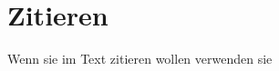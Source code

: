 \chapter{Zitieren}
Wenn sie im Text zitieren wollen verwenden sie \parencite{NiRo00}  \\ \textcite{Hu60} \\ \textcite[97]{McMc87} \textcite[7374]{Hu60}